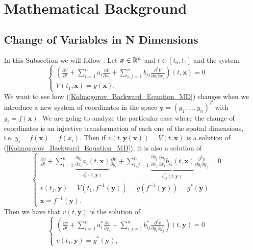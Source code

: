
%
\chapter*{\thechapter \quad Mathematical Background}
\label{appendixB}

\section{Change of Variables in N Dimensions} \label{COV}

In this Subsection we will follow \cite{risken1996fokker}. Let $\bm{x}\in\mathbb{R}^n$ and $t\in[t_0,t_1]$ and the system
\begin{equation}
\begin{cases}
\left(\frac{\partial V}{\partial t}+\sum\limits^{n}_{i=1}a_i\frac{\partial V}{\partial x_i}+\sum\limits^{n}_{i,j=1}b_{ij}\frac{\partial^2V}{\partial x_i\partial x_j}\right)(t,\bm{x})=0\\
V(t_1,\bm{x})=g(\bm{x}).
\end{cases}
\label{Kolmogorov_Backward_Equation_MD}
\end{equation}
We want to see how (\ref{Kolmogorov_Backward_Equation_MD}) changes when we introduce a new system of coordinates in the space $\bm{y}=(y_1,\dots,y_n)^T$ with $y_i=f(\bm{x})$. We are going to analyze the particular case where the change of coordinates is an injective transformation of each one of the spatial dimensions, i.e. $y_i=f(\bm{x})=f(x_i)$. Then if $v(t,\bm{y}(\bm{x}))=V(t,\bm{x})$ is a solution of (\ref{Kolmogorov_Backward_Equation_MD}), it is also a solution of
\begin{equation}
\begin{cases}
\frac{\partial v}{\partial t}+\sum\limits^{n}_{i=1}\underbrace{\frac{\partial y_i}{\partial x_i}a_i(t,\bm{x})}_{a^*_i(t,\bm{y})}\frac{\partial v}{\partial y_i}+\sum\limits^{n}_{i,j=1}\underbrace{\frac{\partial y_j}{\partial x_j}\frac{\partial y_i}{\partial x_i}b_{ij}(t,\bm{x})}_{b^*_{ij}(t,\bm{y})}\frac{\partial^2v}{\partial y_i\partial y_j}=0\\
v(t_1,\bm{y})=V(t_1,f^{-1}(\bm{y}))=g(f^{-1}(\bm{y}))=g^*(\bm{y})\\
\bm{x}=f^{-1}(\bm{y}).
\end{cases}
\end{equation}
Then we have that $v(t,\bm{y})$ is the solution of
\begin{equation}
\begin{cases}
\left(\frac{\partial v}{\partial t}+\sum\limits^{n}_{i=1}a^*_i\frac{\partial v}{\partial y_i}+\sum\limits^{n}_{i,j=1}b^*_{ij}\frac{\partial^2v}{\partial y_i\partial y_j}\right)(t,\bm{y})=0\\
v(t_1,\bm{y})=g^*(\bm{y}),
\end{cases}
\end{equation}
